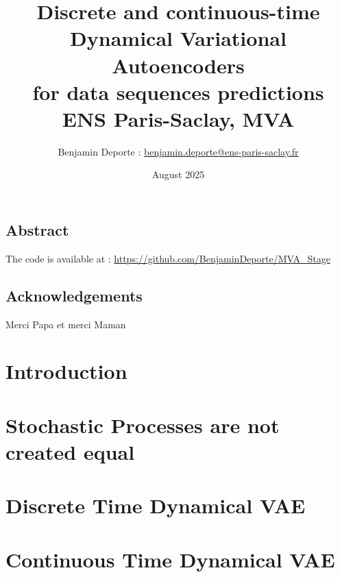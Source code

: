 \documentclass[twoside,11pt]{report}
\title{Discrete and continuous-time\\ Dynamical Variational Autoencoders\\ for data sequences predictions\\
\vspace{1cm}
{\Large{ENS Paris-Saclay, MVA}}}
\author{
Benjamin Deporte : \href{mailto:benjamin.deporte@ens-paris-saclay.fr}{benjamin.deporte@ens-paris-saclay.fr}%
}
\date{August 2025}
\begin{document}
\everymath{\displaystyle}
\maketitle

\chapter*{Abstract}
The code is available at : \url{https://github.com/BenjaminDeporte/MVA_Stage}

\chapter*{Acknowledgements}
Merci Papa et merci Maman

\newpage
\singlespacing
\tableofcontents

\newpage
\listoffigures

\part{Introduction}
    
    
    
    

\part{Stochastic Processes are not created equal}

    
    

\part{Discrete Time Dynamical VAE}

    
    
    
    
    

\part{Continuous Time Dynamical VAE}

    
    
    
\end{document}
